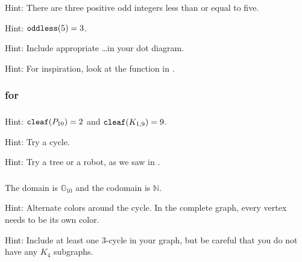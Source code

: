 \subsubsection*{ \answers}
\begin{apart}
    \item Hint: There are three positive odd integers less than or equal to five.
    \item Hint: $\texttt{oddless}(5)=3$.
    \item Hint: Include appropriate \ldots in your dot diagram.
    \item Hint: For inspiration, look at the function in .
\end{apart}

\subsubsection{\answers for  \subfngraphs}

\subsubsection*{ \answers}
\begin{apart}
    \item Hint: $\texttt{cleaf}(P_{10})=2$ and $\texttt{cleaf}(K_{1,9})=9$.
    \item Hint: Try a cycle.
    \item Hint: Try a tree or a robot, as we saw in .
\end{apart}

\subsubsection*{ \answers}
\begin{apart}
    \item The domain is $\mathbb{G}_{10}$ and the codomain is $\mathbb{N}$.
    \item Hint: Alternate colors around the cycle.  In the complete graph, every vertex needs to be its own color.
    \item Hint: Include at least one 3-cycle in your graph, but be careful that you do not have any $K_4$ subgraphs.
\end{apart}

